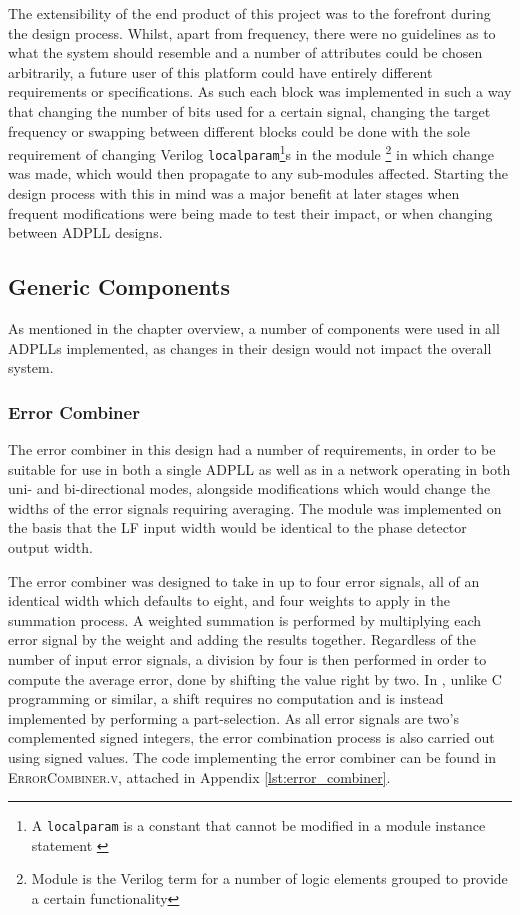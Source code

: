 The extensibility of the end product of this project was to the forefront during the design process. Whilst, apart from frequency, there were no guidelines as to what the system should resemble and a number of attributes could be chosen arbitrarily, a future user of this platform could have entirely different requirements or specifications. As such each block was implemented in such a way that changing the number of bits used for a certain signal, changing the target frequency or swapping between different blocks could be done with the sole requirement of changing Verilog \texttt{localparam}\footnote{A \texttt{localparam} is a constant that cannot be modified in a module instance statement \cite{hdlworks}}s in the module \footnote{Module is the Verilog term for a number of logic elements grouped to provide a certain functionality} in which change was made, which would then propagate to any sub-modules affected. Starting the design process with this in mind was a major benefit at later stages when frequent modifications were being made to test their impact, or when changing between \ac{ADPLL} designs.

\subsection{Generic Components}
As mentioned in the chapter overview, a number of components were used in all \acp{ADPLL} implemented, as changes in their design would not impact the overall system.
\subsubsection{Error Combiner}
The error combiner in this design had a number of requirements, in order to be suitable for use in both a single \ac{ADPLL} as well as in a network operating in both uni- and bi-directional modes, alongside modifications which would change the widths of the error signals requiring averaging. The module was implemented on the basis that the \ac{LF} input width would be identical to the phase detector output width.

The error combiner was designed to take in up to four error signals, all of an identical width which defaults to eight, and four weights to apply in the summation process. A weighted summation is performed by multiplying each error signal by the weight and adding the results together. Regardless of the number of input error signals, a division by four is then performed in order to compute the average error, done by shifting the value right by two. In , unlike C programming or similar, a shift requires no computation and is instead implemented by performing a part-selection. As all error signals are two's complemented signed integers, the error combination process is also carried out using signed values. The code implementing the error combiner can be found in \textsc{ErrorCombiner.v}, attached in Appendix  \ref{lst:error_combiner}.

